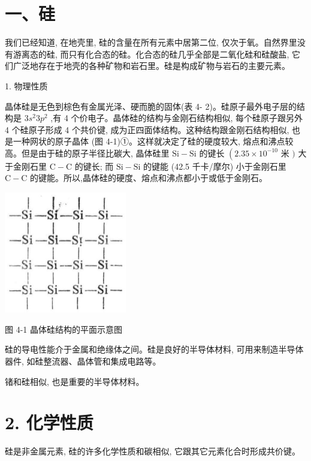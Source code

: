 \documentclass[10pt]{article}
\begin{document}
\section*{一、硅}

我们已经知道, 在地壳里, 硅的含量在所有元素中居第二位, 仅次于氧。自然界里没有游离态的硅, 而只有化合态的硅。化合态的硅几乎全部是二氧化硅和硅酸盐, 它们广泛地存在于地壳的各种矿物和岩石里。硅是构成矿物与岩石的主要元素。

1. 物理性质

晶体硅是无色到棕色有金属光泽、硬而脆的固体(表 4- 2)。硅原子最外电子层的结构是 \(3{s}^{2}3{p}^{2}\) ,有 4 个价电子。晶体硅的结构与金刚石结构相似, 每个硅原子跟另外 4 个硅原子形成 4 个共价键, 成为正四面体结构。这种结构跟金刚石结构相似, 也是一种网状的原子晶体 (图 4-1)①。这样就决定了硅的硬度较大, 熔点和沸点较高。但是由于硅的原子半径比碳大, 晶体硅里 \(\mathrm{{Si}} - \mathrm{{Si}}\) 的键长 \(\left( {{2.35} \times {10}^{-{10}}}\right.\) 米 \()\) 大于金刚石里 \(\mathrm{C} - \mathrm{C}\) 的键长; 而 \(\mathrm{{Si}} - \mathrm{{Si}}\) 的键能 (42.5 千卡/摩尔) 小于金刚石里 \(\mathrm{C} - \mathrm{C}\) 的键能。所以,晶体硅的硬度、熔点和沸点都小于或低于金刚石。

\begin{center}
\includegraphics[max width=0.4\textwidth]{images/01912d13-9986-7822-a012-3f3f7be99dcb_106_252125.jpg}
\end{center}

图 4-1 晶体硅结构的平面示意图

硅的导电性能介于金属和绝缘体之间。硅是良好的半导体材料, 可用来制造半导体器件, 如硅整流器、晶体管和集成电路等。

锗和硅相似, 也是重要的半导体材料。

\section*{2. 化学性质}

硅是非金属元素, 硅的许多化学性质和碳相似, 它跟其它元素化合时形成共价键。
\end{document}
